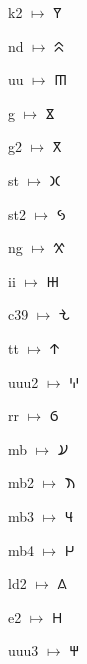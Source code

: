 {\noindent k2 $\mapsto$ {\ftcafont 𐊽}\par
\noindent nd $\mapsto$ {\ftcafont 𐊾}\par
\noindent uu $\mapsto$ {\ftcafont 𐊿}\par
\noindent g $\mapsto$ {\ftcafont 𐋀}\par
\noindent g2 $\mapsto$ {\ftcafont 𐋁}\par
\noindent st $\mapsto$ {\ftcafont 𐋂}\par
\noindent st2 $\mapsto$ {\ftcafont 𐋃}\par
\noindent ng $\mapsto$ {\ftcafont 𐋄}\par
\noindent ii $\mapsto$ {\ftcafont 𐋅}\par
\noindent c39 $\mapsto$ {\ftcafont 𐋆}\par
\noindent tt $\mapsto$ {\ftcafont 𐋇}\par
\noindent uuu2 $\mapsto$ {\ftcafont 𐋈}\par
\noindent rr $\mapsto$ {\ftcafont 𐋉}\par
\noindent mb $\mapsto$ {\ftcafont 𐋊}\par
\noindent mb2 $\mapsto$ {\ftcafont 𐋋}\par
\noindent mb3 $\mapsto$ {\ftcafont 𐋌}\par
\noindent mb4 $\mapsto$ {\ftcafont 𐋍}\par
\noindent ld2 $\mapsto$ {\ftcafont 𐋎}\par
\noindent e2 $\mapsto$ {\ftcafont 𐋏}\par
\noindent uuu3 $\mapsto$ {\ftcafont 𐋐}\par
}

